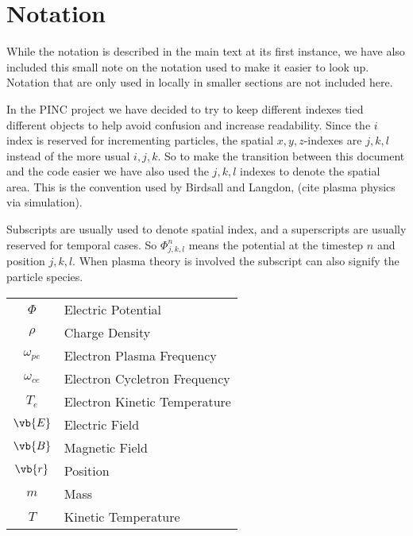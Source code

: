 \section{Notation}
  While the notation is described in the main text at its first instance, we have also included
  this small note on the notation used to make it easier to look up.
  Notation that are only used in locally in smaller sections are not included here.

  In the PINC project we have decided to try to keep different indexes tied different
  objects to help avoid confusion and increase readability. Since the \(i\) index is
  reserved for incrementing particles, the spatial \(x,y,z\)-indexes are \(j,k,l\) instead of the
  more usual \(i,j,k\). So to make the transition between this document and the code
  easier we have also used the \(j,k,l\) indexes to denote the spatial area.
  This is the convention used by Birdsall and Langdon, (cite plasma physics via simulation).


  Subscripts are usually used to denote spatial index, and a superscripts are usually
  reserved for temporal cases. So \( \Phi^n_{j,k,l} \) means the potential at
  the timestep \(n\) and position \(j,k,l\). When plasma theory is involved the subscript
  can also signify the particle species.


  \begin{centering}
    \begin{tabular}{c |l}
      \(\Phi\) & Electric Potential
      \\
      \(\rho\) & Charge Density
      \\
      \(\omega_{pe}\) & Electron Plasma Frequency
      \\
      \(\omega_{ce}\) & Electron Cycletron Frequency
      \\
      \(T_e\)   & Electron Kinetic Temperature
      \\
      \(\vb{E} \)   & Electric Field
      \\
      \(\vb{B}\)    & Magnetic Field
      \\
      \(\vb{r} \)   & Position
      \\
      \(m \)        & Mass
      \\
      \(T \)        & Kinetic Temperature
    \end{tabular}
  \end{centering}
